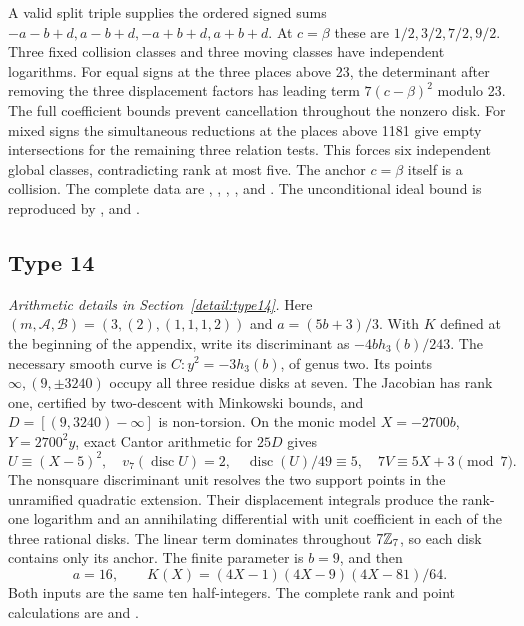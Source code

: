 A valid split triple supplies the ordered signed sums
$-a-b+d,a-b+d,-a+b+d,a+b+d$. At $c=\beta$ these are
$1/2,3/2,7/2,9/2$. Three fixed collision classes and three moving
classes have independent logarithms. For equal signs at the three
places above 23, the determinant after removing the three displacement
factors has leading term $7(c-\beta)^2$ modulo 23. The full coefficient
bounds prevent cancellation throughout the nonzero disk. For mixed
signs the simultaneous reductions at the places above 1181 give
empty intersections for the remaining three relation tests. This
forces six independent global classes, contradicting rank at most five.
The anchor $c=\beta$ itself is a collision.
The complete data are ,
, ,
, 
and . The unconditional ideal bound is
reproduced by ,
 and
.

\subsection{Type 14}\label{app:type14}
\noindent\emph{Arithmetic details in Section~\ref{detail:type14}.}\enspace
Here $(m,\mathcal A,\mathcal B)=(3,(2),(1,1,1,2))$ and
$a=(5b+3)/3$. With $K$ defined at the beginning of the appendix,
write its discriminant as $-4b h_3(b)/243$. The necessary smooth
curve is $C:y^2=-3h_3(b)$, of genus two. Its points
$\infty,(9,\pm3240)$ occupy all three residue disks at seven.
The Jacobian has rank one, certified by two-descent with Minkowski
bounds, and $D=[(9,3240)-\infty]$ is non-torsion.
On the monic model $X=-2700b$, $Y=2700^2y$, exact Cantor
arithmetic for $25D$ gives
\[
 U\equiv(X-5)^2,\quad v_7(\operatorname{disc}U)=2,
 \quad \operatorname{disc}(U)/49\equiv5,\quad7V\equiv5X+3\pmod7.
\]
The nonsquare discriminant unit resolves the two support points in
the unramified quadratic extension. Their displacement integrals
produce the rank-one logarithm and an annihilating differential
with unit coefficient in each of the three rational disks.
The linear term dominates throughout $7\mathbb Z_7$, so each disk
contains only its anchor. The finite parameter is $b=9$, and then
\[
 a=16,\qquad K(X)=(4X-1)(4X-9)(4X-81)/64.
\]
Both inputs are the same ten half-integers. The complete rank and
point calculations are  and
.

